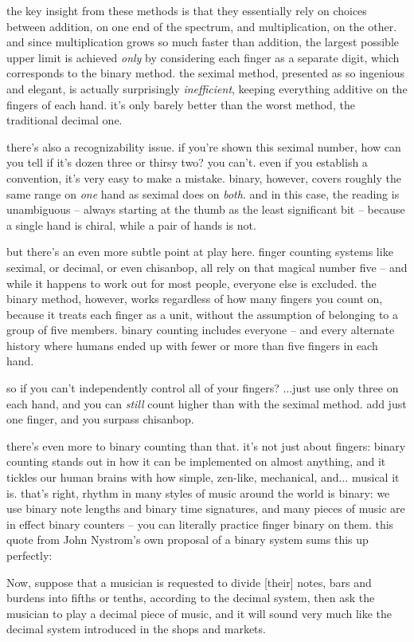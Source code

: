 \documentclass[../best.tex]{subfiles}
\begin{document}
the key insight from these methods is that they essentially rely on choices between addition, on one end of the spectrum, and multiplication, on the other. and since multiplication grows so much faster than addition, the largest possible upper limit is achieved \emph{only} by considering each finger as a separate digit, which corresponds to the binary method.\myfootnote{} the seximal method, presented as so ingenious and elegant, is actually surprisingly \emph{inefficient}, keeping everything additive on the fingers of each hand. it's only barely better than the worst method, the traditional decimal one.\myfootnote{}

there's also a recognizability issue. if you're shown this seximal number, how can you tell if it's dozen three or thirsy two? you can't. even if you establish a convention, it's very easy to make a mistake. binary, however, covers roughly the same range on \emph{one} hand as seximal does on \emph{both}. and in this case, the reading is unambiguous -- always starting at the thumb as the least significant bit -- because a single hand is chiral, while a pair of hands is not.

but there's an even more subtle point at play here. finger counting systems like seximal, or decimal, or even chisanbop, all rely on that magical number five -- and while it happens to work out for most people, everyone else is excluded. the binary method, however, works regardless of how many fingers you count on, because it treats each finger as a unit, without the assumption of belonging to a group of five members. binary counting includes everyone -- and every alternate history where humans ended up with fewer or more than five fingers in each hand.\myfootnote{}

so if you can't independently control all of your fingers? ...just use only three on each hand, and you can \emph{still} count higher than with the seximal method. add just one finger, and you surpass chisanbop.

there's even more to binary counting than that. it's not just about fingers: binary counting stands out in how it can be implemented on almost anything,\myfootnote{} and it tickles our human brains with how simple, zen-like, mechanical, and... musical it is. that's right, rhythm in many styles of music around the world is binary: we use binary note lengths and binary time signatures, and many pieces of music are in effect binary counters -- you can literally practice finger binary on them. this quote from John Nystrom's own proposal of a binary system sums this up perfectly:\myfootnote{}

\begin{quoting}
	Now, suppose that a musician is requested to divide [their] notes, bars and burdens into fifths or tenths, according to the decimal system, then ask the musician to play a decimal piece of music, and it will sound very much like the decimal system introduced in the shops and markets.
\end{quoting}
\end{document}
